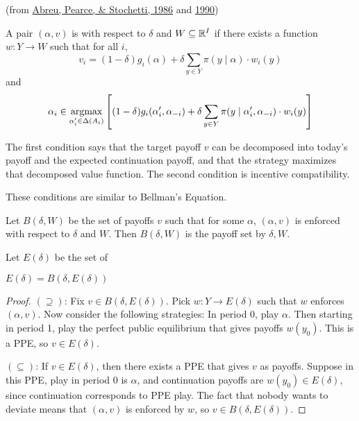 \documentclass[10pt]{article}
\begin{document}
\begin{model}
	 (from \href{https://www.sciencedirect.com/science/article/pii/0022053186900281}{Abreu, Pearce, \& Stochetti, 1986} and \href{https://www.jstor.org/stable/2938299?seq=1}{1990}) \begin{definition}
		A pair $(\alpha,v)$ is  with respect to $\delta$ and $W \subseteq \mathbb{R}^I$ if there exists a function $w: Y \to W$ such that for all $i$,\[v_i = (1-\delta)g_i(\alpha) + \delta \sum_{y\in Y} \pi(y \mid \alpha)\cdot  w_i(y)\]and \[\alpha_i \in \mathop{\rm argmax}_{\alpha_i' \in \Delta(A_i)} \left[ (1-\delta)g_i(\alpha_i',\alpha_{-i}) + \delta \sum_{y \in Y} \pi(y \mid \alpha_i',\alpha_{-i}) \cdot w_i(y)\right]\]
	\end{definition}
	\begin{remark}
		The first condition says that the target payoff $v$ can be decomposed into today's payoff and the expected continuation payoff, and that the strategy maximizes that decomposed value function. The second condition is incentive compatibility.
	\end{remark}
	These conditions are similar to Bellman's Equation.
	
	\begin{definition}
		Let $B(\delta,W)$ be the set of payoffs $v$ such that for some $\alpha$, $(\alpha,v)$ is enforced with respect to $\delta$ and $W$. Then $B(\delta,W)$ is the payoff set  by $\delta,W$.
	\end{definition}
	\begin{definition}
		Let $E(\delta)$ be the set of \blue{PPE payoffs} 
	\end{definition}
	\begin{proposition}
		$E(\delta) = B(\delta,E(\delta))$
	\end{proposition}
	\begin{proof}
		$(\supseteq)$: Fix $v \in B(\delta,E(\delta))$. Pick $w : Y \to E(\delta)$ such that $w$ enforces $(\alpha,v)$. Now consider the following strategies: In period 0, play $\alpha$. Then starting in period 1, play the perfect public equilibrium that gives payoffs $w(y_0)$. This is a PPE, so $v \in E(\delta)$.
		
		$(\subseteq)$: If $v \in E(\delta)$, then there exists a PPE that gives	$v$ as payoffs. Suppose in this PPE, play in period 0 is $\alpha$, and continuation payoffs are $w(y_0) \in E(\delta)$, since continuation corresponds to PPE play. The fact that nobody wants to deviate means that $(\alpha,v)$ is enforced by $w$, so $v \in B(\delta,E(\delta))$.
	\end{proof}
		

\end{model}
\end{document}
